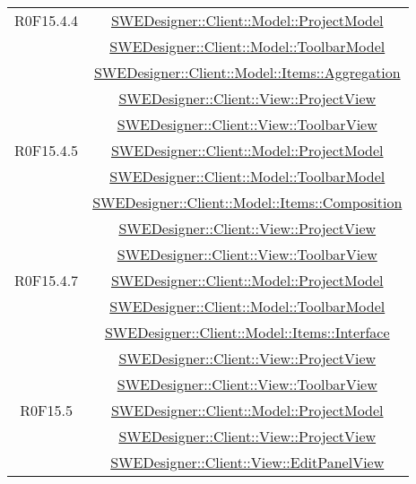 \documentclass[../DefinizioneDiProdotto.tex]{subfiles}
\begin{document}
\begin{longtable}{|c|c|}
				R0F15.4.4
				& \hyperlink{SWEDesigner::Client::Model::ProjectModel}{SWEDesigner::Client::Model::ProjectModel}\\
				& \hyperlink{SWEDesigner::Client::Model::ToolbarModel}{SWEDesigner::Client::Model::ToolbarModel}\\
				& \hyperlink{SWEDesigner::Client::Model::Items::Aggregation}{SWEDesigner::Client::Model::Items::Aggregation}\\
				& \hyperlink{SWEDesigner::Client::View::ProjectView}{SWEDesigner::Client::View::ProjectView}\\
				& \hyperlink{SWEDesigner::Client::View::ToolbarView}{SWEDesigner::Client::View::ToolbarView}\\
				\hline

				R0F15.4.5
				& \hyperlink{SWEDesigner::Client::Model::ProjectModel}{SWEDesigner::Client::Model::ProjectModel}\\
				& \hyperlink{SWEDesigner::Client::Model::ToolbarModel}{SWEDesigner::Client::Model::ToolbarModel}\\
				& \hyperlink{SWEDesigner::Client::Model::Items::Composition}{SWEDesigner::Client::Model::Items::Composition}\\
				& \hyperlink{SWEDesigner::Client::View::ProjectView}{SWEDesigner::Client::View::ProjectView}\\
				& \hyperlink{SWEDesigner::Client::View::ToolbarView}{SWEDesigner::Client::View::ToolbarView}\\
				\hline

				R0F15.4.7
				& \hyperlink{SWEDesigner::Client::Model::ProjectModel}{SWEDesigner::Client::Model::ProjectModel}\\
				& \hyperlink{SWEDesigner::Client::Model::ToolbarModel}{SWEDesigner::Client::Model::ToolbarModel}\\
				& \hyperlink{SWEDesigner::Client::Model::Items::Interface}{SWEDesigner::Client::Model::Items::Interface}\\
				& \hyperlink{SWEDesigner::Client::View::ProjectView}{SWEDesigner::Client::View::ProjectView}\\
				& \hyperlink{SWEDesigner::Client::View::ToolbarView}{SWEDesigner::Client::View::ToolbarView}\\
				\hline

				R0F15.5
				& \hyperlink{SWEDesigner::Client::Model::ProjectModel}{SWEDesigner::Client::Model::ProjectModel}\\
				& \hyperlink{SWEDesigner::Client::View::ProjectView}{SWEDesigner::Client::View::ProjectView}\\
				& \hyperlink{SWEDesigner::Client::View::EditPanelView}{SWEDesigner::Client::View::EditPanelView}\\
				\hline


\end{longtable}
\end{document}
